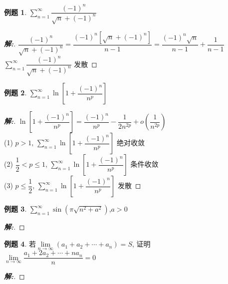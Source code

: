\documentclass[12pt,a4paper]{ctexart}
\newenvironment{solution}{\begin{proof}[\hspace{2em}\textbf{解:}]}{\end{proof}}
\theoremstyle{definition}%
\newtheorem{exercise}{\hspace{2em}例题}
\begin{document}
\begin{exercise}
	$ \displaystyle\sum_{n=1}^{\infty} \dfrac{(-1)^n}{\sqrt{n}+(-1)^n} $
\end{exercise}
\begin{solution}
	$ \dfrac{(-1)^n}{\sqrt{n}+(-1)^n}
	=\dfrac{(-1)^n[\sqrt{n}+(-1)^n]}{n-1}
	=\dfrac{(-1)^n\sqrt{n}}{n-1}+\dfrac{1}{n-1} $\\
	
	$ \displaystyle\sum_{n=1}^{\infty} \dfrac{(-1)^n}{\sqrt{n}+(-1)^n} $ 发散
\end{solution}

\begin{exercise}
	$ \displaystyle\sum_{n=1}^{\infty} \ln\left[1+\dfrac{(-1)^n}{n^p}\right] $
\end{exercise}
\begin{solution}
	$ \ln\left[1+\dfrac{(-1)^n}{n^p}\right]
	=\dfrac{(-1)^n}{n^p}-\dfrac{1}{2 n^{2p}}+o(\dfrac{1}{n^{2p}}) $\\
	
	(1) $ p>1 $, $ \displaystyle\sum_{n=1}^{\infty} \ln\left[1+\dfrac{(-1)^n}{n^p}\right] $ 绝对收敛\\
	
	(2) $ \dfrac{1}{2} < p \le 1 $, $ \displaystyle\sum_{n=1}^{\infty} \ln\left[1+\dfrac{(-1)^n}{n^p}\right] $ 条件收敛\\
	
	(3) $ p \le \dfrac{1}{2} $, $ \displaystyle\sum_{n=1}^{\infty} \ln\left[1+\dfrac{(-1)^n}{n^p}\right] $ 发散
	
\end{solution}

\begin{exercise}
	$ \displaystyle\sum_{n=1}^{\infty} \sin\left(\pi\sqrt{n^2+a^2}\right) $,$ a>0 $
\end{exercise}
\begin{solution}
	
\end{solution}

\begin{exercise}
	若$ \lim\limits_{n \to \infty}(a_1+a_2+\cdots+a_n)=S $, 证明\\
	
	$ \lim\limits_{n \to \infty}\dfrac{a_1+2a_2+\cdots+na_n}{n}=0 $
\end{exercise}
\begin{solution}
	
\end{solution}
\end{document}
